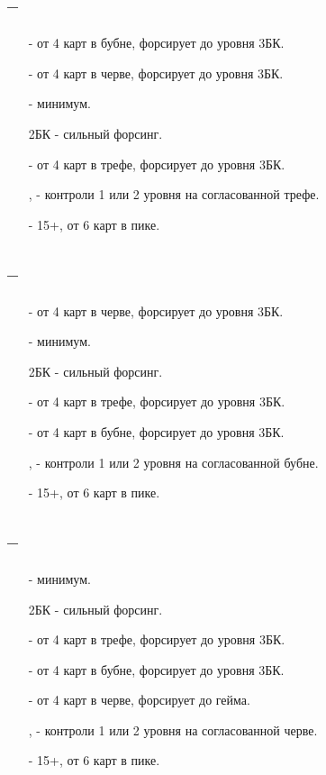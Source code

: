 \documentclass{article}
\begin{document}
\subsection{ -- }
\begin{enumerate} 
    \item[\di{2}] - от 4 карт в бубне, форсирует до уровня 3БК.
    \item[\he{2}] - от 4 карт в черве, форсирует до уровня 3БК.
    \item[\sp{2}] - минимум.
    \item[2БК] - сильный форсинг.
    \item[\cl{3}] - от 4 карт в трефе, форсирует до уровня 3БК.
    \item[\di{3}, \he{3}] - контроли 1 или 2 уровня на согласованной трефе.
    \item[\sp{3}] - 15+, от 6 карт в пике.
\end{enumerate}
\subsection{ -- }
\begin{enumerate} 
    \item[\he{2}] - от 4 карт в черве, форсирует до уровня 3БК.
    \item[\sp{2}] - минимум.
    \item[2БК] - сильный форсинг.
    \item[\cl{3}] - от 4 карт в трефе, форсирует до уровня 3БК.
    \item[\di{3}] - от 4 карт в бубне, форсирует до уровня 3БК.
    \item[\he{3}, \cl{4}] - контроли 1 или 2 уровня на согласованной бубне.
    \item[\sp{3}] - 15+, от 6 карт в пике.
\end{enumerate}
\subsection{ -- }
\begin{enumerate} 
    \item[\sp{2}] - минимум.
    \item[2БК] - сильный форсинг.
    \item[\cl{3}] - от 4 карт в трефе, форсирует до уровня 3БК.
    \item[\di{3}] - от 4 карт в бубне, форсирует до уровня 3БК.
    \item[\he{3}] - от 4 карт в черве, форсирует до гейма.
    \item[\cl{4}, \di{4}] - контроли 1 или 2 уровня на согласованной черве.
    \item[\sp{3}] - 15+, от 6 карт в пике.
\end{enumerate}
\end{document}
